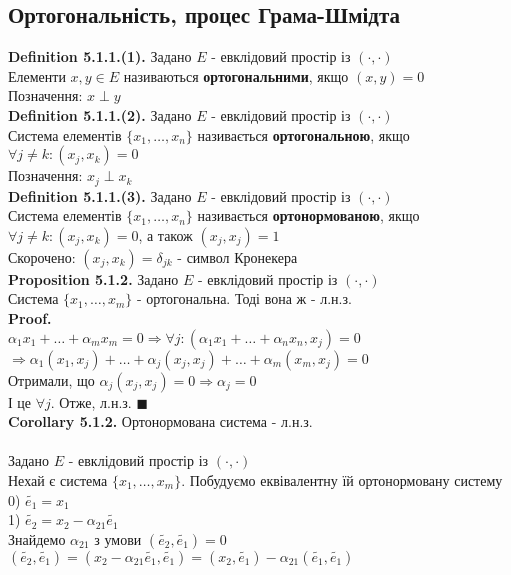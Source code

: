 \documentclass[a4paper, 14pt]{extarticle}
\def\defin#1{\textbf{Definition {#1}}}
\def\prp#1{\textbf{Proposition {#1}}}
\def\crl#1{\textbf{Corollary {#1}}}
\def\proof{\textbf{Proof.}\\}
\def\bigline{\vspace{5mm}\\}
\def\qed{$\blacksquare$}
\begin{document}
\subsection{Ортогональність, процес Грама-Шмідта}
\defin{5.1.1.(1).} Задано $E$ - евклідовий простір із $(\cdot,\cdot)$\\
Елементи $x,y \in E$ називаються \textbf{ортогональними}, якщо $(x,y) = 0$\\
Позначення: $x \perp y$
\bigline
\defin{5.1.1.(2).} Задано $E$ - евклідовий простір із $(\cdot,\cdot)$\\
Система елементів $\{x_1,\dots,x_n\}$ називається \textbf{ортогональною}, якщо \\ $\forall j \neq k: (x_j,x_k) = 0$\\
Позначення: $x_j \perp x_k$
\bigline
\defin{5.1.1.(3).} Задано $E$ - евклідовий простір із $(\cdot,\cdot)$\\
Система елементів $\{x_1,\dots,x_n\}$ називається \textbf{ортонормованою}, якщо \\ $\forall j \neq k: (x_j,x_k) = 0$, а також $(x_j,x_j) = 1$\\
Скорочено: $(x_j,x_k) = \delta_{jk}$ - символ Кронекера
\bigline
\prp{5.1.2.} Задано $E$ - евклідовий простір із $(\cdot,\cdot)$\\
Система $\{x_1,\dots,x_m\}$ - ортогональна. Тоді вона ж - л.н.з.\\
\proof
$\alpha_1 x_1 + \dots + \alpha_m x_m = 0 \Rightarrow \forall j: (\alpha_1 x_1 + \dots + \alpha_n x_n, x_j) = 0$\\
$\Rightarrow \alpha_1 (x_1,x_j) + \dots + \alpha_j (x_j,x_j) + \dots + \alpha_m (x_m,x_j) = 0$\\
Отримали, що $\alpha_j (x_j,x_j) = 0 \Rightarrow \alpha_j = 0$\\
І це $\forall j$. Отже, л.н.з. \qed
\bigline
\crl{5.1.2.} Ортонормована система - л.н.з.
\bigline
\\
Задано $E$ - евклідовий простір із $(\cdot,\cdot)$\\
Нехай є система $\{x_1,\dots,x_m\}$. Побудуємо еквівалентну їй ортонормовану систему\\
0) $\tilde{e_1}=x_1$\\
1) $\tilde{e_2} = x_2 - \alpha_{21} \tilde{e_1}$\\
Знайдемо $\alpha_{21}$ з умови $(\tilde{e_2}, \tilde{e_1}) = 0$\\
$(\tilde{e_2}, \tilde{e_1}) = (x_2-\alpha_{21}\tilde{e_1}, \tilde{e_1}) = (x_2, \tilde{e_1})-\alpha_{21} (\tilde{e_1},\tilde{e_1})$\\
\end{document}
